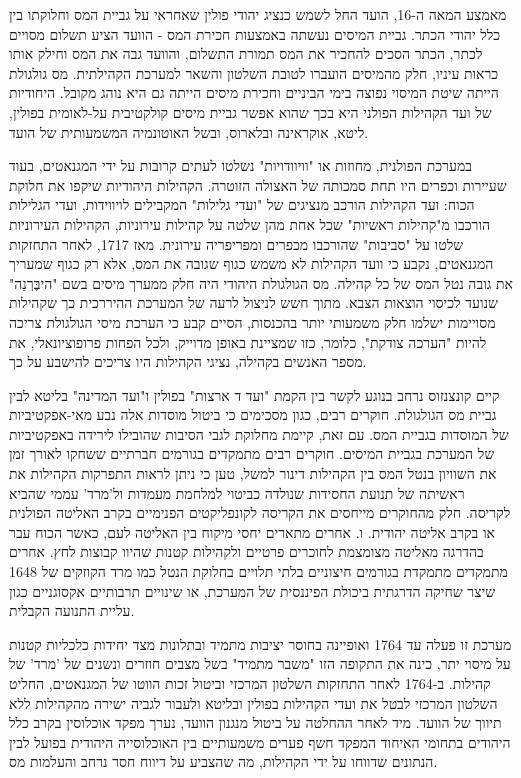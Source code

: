 מאמצע המאה ה-16, הועד החל לשמש כנציג יהודי פולין שאחראי על גביית המס וחלוקתו בין כלל יהודי הכתר. גביית המיסים נעשתה באמצעות חכירת המס - הוועד הציע תשלום מסויים לכתר, הכתר הסכים להחכיר את המס תמורת התשלום, והוועד גבה את המס וחילק אותו כראות עיניו, חלק מהמיסים הועברו לטובת השלטון והשאר למערכת הקהילתית. מס גולגולת הייתה שיטת המיסוי נפוצה בימי הביניים וחכירת מיסים הייתה גם היא נוהג מקובל. היחודיות של ועד הקהילות הפולני היא בכך שהוא אפשר גביית מיסים קולקטיבית על-לאומית בפולין, ליטא, אוקראינה ובלארוס, ובשל האוטונמיה המשמעותית של הועד.

במערכת הפולנית, מחוזות או "וויוודויות" נשלטו לעתים קרובות על ידי המגנאטים, בעוד שעיירות וכפרים היו תחת סמכותה של האצולה הזוטרה. הקהילות היהודיות שיקפו את חלוקת הכוח: ועד הקהילות הורכב מנציגים של "ועדי גלילות" המקבילים לויווידות, ועדי הגלילות הורכבו מ"קהילות ראשיות" שכל אחת מהן שלטה על קהילות עירוניות, הקהילות העירוניות שלטו על "סביבות" שהורכבו מכפרים ומפריפריה עירונית.
מאז 1717, לאחר התחזקות המגנאטים, נקבע כי וועד הקהילות לא משמש כגוף שגובה את המס, אלא רק כגוף שמעריך את גובה נטל המס של כל קהילה. מס הגולגולת היהודי היה חלק ממערך מיסים בשם "היבֶּרְנַה" שנועד לכיסוי הוצאות הצבא. מתוך חשש לניצול לרעה של המערכת ההיררכית כך שקהילות מסויימות ישלמו חלק משמעותי יותר בהכנסות, הסיים קבע כי הערכת מיסי הגולגולת צריכה להיות "הערכה צודקת", כלומר, כזו שמציינת באופן מדוייק, ולכל הפחות פרופוציונאלי, את מספר האנשים בקהילה, נציגי הקהילות היו צריכים להישבע על כך. 

קיים קונצנזוס נרחב בנוגע לקשר  בין הקמת "ועד ד ארצות" בפולין ו"ועד המדינה" בליטא לבין גביית מס הגולגולת. חוקרים רבים, כגון מסכימים כי ביטול מוסדות אלה נבע מאי-אפקטיביות של המוסדות בגביית המס. עם זאת, קיימת מחלוקת לגבי הסיבות שהובילו לירידה באפקטיביות של המערכת בגביית המיסים.  חוקרים רבים מתמקדים בגורמים חברתיים ששחקו לאורך זמן את השוויון בנטל המס בין הקהילות דינור למשל, טען כי ניתן לראות התפרקות הקהילות את ראשיתה של תנועת החסידות שנולדה כביטוי למלחמת מעמדות ול'מרד' עממי שהביא לקריסה. חלק מהחוקרים מייחסים את הקריסה לקונפליקטים הפנימיים בקרב האליטה הפולנית או בקרב אליטה יהודית. \cite{teller_early_2010-1} ו\cite{kazmierczyk_permanent_2022}. אחרים מתארים יחסי מיקוח בין האליטה לעם, כאשר הכוח עבר בהדרגה מאליטה מצומצמת לחוכרים פרטיים ולקהילות קטנות שהיוו קבוצות לחץ.  \cite{kalik_scepter_2009}
אחרים מתמקדים מתמקדת בגורמים חיצוניים בלתי תלויים בחלוקת הנטל כמו מרד הקוזקים של 1648 שיצר שחיקה הדרגתית ביכולת הפיננסית של המערכת, או שינויים תרבותיים אקסוגניים כגון עליית התנועה הקבלית.\cite{hundert_jews_2004}

מערכת זו פעלה עד 1764 ואופיינה בחוסר יציבות מתמיד ובתלונות מצד יחידות כלכליות קטנות על מיסוי יתר, \citep{kazmierczyk_permanent_2022}  כינה את התקופה הזו "משבר מתמיד" בשל מצבים חוזרים ונשנים של 'מרד' של קהילות. ב-1764 לאחר התחזקות השלטון המרכזי וביטול זכות הווטו של המגנאטים, החליט השלטון המרכזי לבטל את ועדי הקהילות בפולין ובליטא ולעבור לגביה ישירה מהקהילות ללא תיווך של הוועד. מיד לאחר ההחלטה על ביטול מנגנון הוועד, נערך מפקד אוכלוסין בקרב כלל היהודים בתחומי האיחוד
המפקד חשף פערים משמעותיים בין האוכלוסייה היהודית בפועל לבין הנתונים שדווחו על ידי הקהילות, מה שהצביע על דיווח חסר נרחב והעלמות מס.

